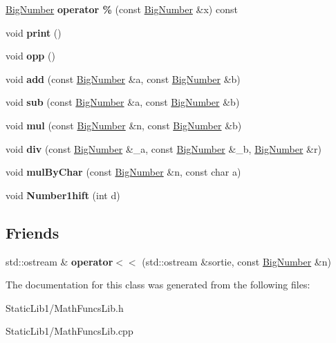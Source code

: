 \begin{DoxyCompactItemize}
\mbox{\hyperlink{class_big_number}{Big\+Number}} {\bfseries operator \%} (const \mbox{\hyperlink{class_big_number}{Big\+Number}} \&x) const
\item 
\mbox{\label{class_big_number_a12b0e9ff1459434b916e73468bd41981}} 
void {\bfseries print} ()
\item 
\mbox{\label{class_big_number_af17d29f6b98c0c14802453b54d26c914}} 
void {\bfseries opp} ()
\item 
\mbox{\label{class_big_number_ae49fff54ea87c2bc24591bee3a2e6ae6}} 
void {\bfseries add} (const \mbox{\hyperlink{class_big_number}{Big\+Number}} \&a, const \mbox{\hyperlink{class_big_number}{Big\+Number}} \&b)
\item 
\mbox{\label{class_big_number_aac8e67f6597f7300a99b07bffe0d53ca}} 
void {\bfseries sub} (const \mbox{\hyperlink{class_big_number}{Big\+Number}} \&a, const \mbox{\hyperlink{class_big_number}{Big\+Number}} \&b)
\item 
\mbox{\label{class_big_number_aa0f9800577aaa0b28b99bebf63ec1c8b}} 
void {\bfseries mul} (const \mbox{\hyperlink{class_big_number}{Big\+Number}} \&n, const \mbox{\hyperlink{class_big_number}{Big\+Number}} \&b)
\item 
\mbox{\label{class_big_number_ab56b45758c31d46f6146baa6af58d673}} 
void {\bfseries div} (const \mbox{\hyperlink{class_big_number}{Big\+Number}} \&\+\_\+a, const \mbox{\hyperlink{class_big_number}{Big\+Number}} \&\+\_\+b, \mbox{\hyperlink{class_big_number}{Big\+Number}} \&r)
\item 
\mbox{\label{class_big_number_abbb18cadc755b297554c3269d31b8fbc}} 
void {\bfseries mul\+By\+Char} (const \mbox{\hyperlink{class_big_number}{Big\+Number}} \&n, const char a)
\item 
\mbox{\label{class_big_number_aba8e3b374d0af4643fd1060494bbf24b}} 
void {\bfseries Number1hift} (int d)
\end{DoxyCompactItemize}
\subsection*{Friends}
\begin{DoxyCompactItemize}
\item 
\mbox{\label{class_big_number_aceb74400f01549b037d56dba7c7aa216}} 
std\+::ostream \& {\bfseries operator$<$$<$} (std\+::ostream \&sortie, const \mbox{\hyperlink{class_big_number}{Big\+Number}} \&n)
\end{DoxyCompactItemize}


The documentation for this class was generated from the following files\+:\begin{DoxyCompactItemize}
\item 
Static\+Lib1/Math\+Funcs\+Lib.\+h\item 
Static\+Lib1/Math\+Funcs\+Lib.\+cpp\end{DoxyCompactItemize}
